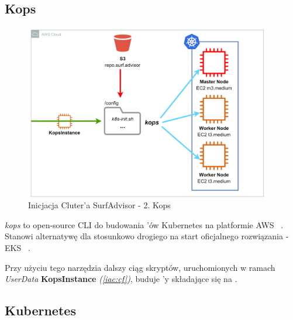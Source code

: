 \subsection{Kops}
\label{iac:kops}

\begin{figure}[!ht]
	\begin{center}
		\includegraphics[width=0.95\textwidth]{img/IAC-step2}
	\end{center}
	\caption{Inicjacja Cluter'a SurfAdvisor - 2. Kops}
\end{figure}

\emph{kops} to open-source CLI do budowania 'ów Kubernetes na platformie AWS ~\cite{kops-k8s}.
Stanowi alternatywę dla stosunkowo drogiego na start oficjalnego rozwiązania - EKS ~\cite{eks-pricing}.

Przy użyciu tego narzędzia dalszy ciąg skryptów, uruchomionych w ramach \emph{UserData} \textbf{KopsInstance} \emph{(\ref{iac:cf})}, buduje 'y składające się na .


\subsection{Kubernetes}
\label{iac:kubectl}

